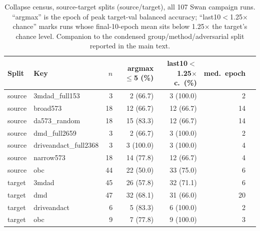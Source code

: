 \begin{table}[t]
\centering
\caption{Collapse census, source-target splits (source/target), all 107 Swan campaign runs. ``argmax'' is the epoch of peak target-val balanced accuracy; ``last10$<$1.25$\times$chance'' marks runs whose final-10-epoch mean sits below 1.25$\times$ the target's chance level. Companion to the condensed group/method/adversarial split reported in the main text.}
\label{tab:collapse_census_source_target}
\footnotesize
\setlength{\tabcolsep}{3pt}
\begin{tabular}{llrrrrr}
\toprule
Split & Key & $n$ & argmax$\leq$5 (\%) & last10$<$1.25$\times$c.\ (\%) & med.\ epoch \\
\midrule
source & 3mdad\_full153 & 3 & 2 (66.7) & 3 (100.0) & 2 \\
source & broad573 & 18 & 12 (66.7) & 12 (66.7) & 14 \\
source & da573\_random & 18 & 15 (83.3) & 12 (66.7) & 14 \\
source & dmd\_full2659 & 3 & 2 (66.7) & 3 (100.0) & 2 \\
source & driveandact\_full2368 & 3 & 3 (100.0) & 3 (100.0) & 4 \\
source & narrow573 & 18 & 14 (77.8) & 12 (66.7) & 4 \\
source & obc & 44 & 22 (50.0) & 33 (75.0) & 6 \\
\midrule
target & 3mdad & 45 & 26 (57.8) & 32 (71.1) & 6 \\
target & dmd & 47 & 32 (68.1) & 31 (66.0) & 20 \\
target & driveandact & 6 & 5 (83.3) & 6 (100.0) & 2 \\
target & obc & 9 & 7 (77.8) & 9 (100.0) & 3 \\
\bottomrule
\end{tabular}
\end{table}
